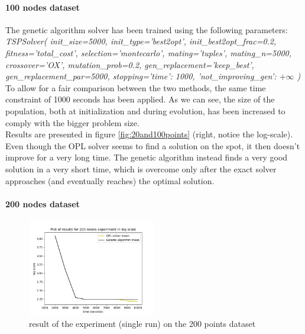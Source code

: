 \documentclass{article}
\begin{document}
\paragraph*{100 nodes dataset}

The genetic algorithm solver has been trained using the following parameters: \\
\textit{TSPSolver(
        init\_size=5000, init\_type='best2opt', init\_best2opt\_frac=0.2, fitness='total\_cost',
        selection='montecarlo', mating='tuples', mating\_n=5000, crossover='OX', mutation\_prob=0.2,
        gen\_replacement='keep\_best', gen\_replacement\_par=5000,
        stopping={'time': 1000, 'not\_improving\_gen': $+\infty$}
    )} \\
\newline
To allow for a fair comparison between the two methods, the same time constraint of 1000 seconds has been applied. As we can see, the size of the population, both at initialization and during evolution, has been increased to comply with the bigger problem size. \\
Results are presented in figure \ref{fig:20and100points} (right, notice the log-scale). Even though the OPL solver seems to find a solution on the spot, it then doesn't improve for a very long time. The genetic algorithm instead finds a very good solution in a very short time, which is overcome only after the exact solver approaches (and eventually reaches) the optimal solution.


\paragraph*{200 nodes dataset}

\begin{figure}
    \centering
\includegraphics[width=0.5\textwidth]{pics/200_nodes_results.png}
\caption{result of the experiment (single run) on the 200 points dataset}
\label{fig:200points}
\end{figure}
\end{document}
